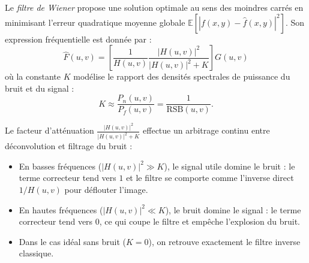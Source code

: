 \begin{theorem}
    Le \emph{filtre de Wiener} propose une solution optimale au sens des moindres carrés en minimisant l'erreur quadratique moyenne globale $\mathbb{E}[|f(x,y) - \hat{f}(x,y)|^2]$. Son expression fréquentielle est donnée par :
    \begin{equation}
        \boxed{\hat{F}(u,v) = \left[ \frac{1}{H(u,v)} \frac{|H(u,v)|^2}{|H(u,v)|^2 + K} \right] G(u,v)}
    \end{equation}
    où la constante $K$ modélise le rapport des densités spectrales de puissance du bruit et du signal :
    \begin{equation}
        K \approx \frac{P_n(u,v)}{P_f(u,v)} = \frac{1}{\text{RSB}(u,v)}.
    \end{equation}
\end{theorem}

\begin{remark}
    Le facteur d'atténuation $\frac{|H(u,v)|^2}{|H(u,v)|^2 + K}$ effectue un arbitrage continu entre déconvolution et filtrage du bruit :
    \begin{itemize}
        \item En basses fréquences ($|H(u,v)|^2 \gg K$), le signal utile domine le bruit : le terme correcteur tend vers $1$ et le filtre se comporte comme l'inverse direct $1/H(u,v)$ pour déflouter l'image.
        \item En hautes fréquences ($|H(u,v)|^2 \ll K$), le bruit domine le signal : le terme correcteur tend vers $0$, ce qui coupe le filtre et empêche l'explosion du bruit.
        \item Dans le cas idéal sans bruit ($K = 0$), on retrouve exactement le filtre inverse classique.
    \end{itemize}
\end{remark}